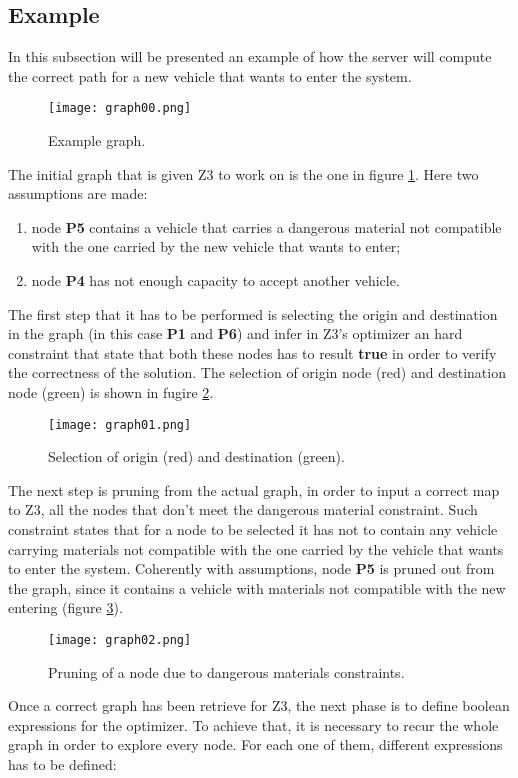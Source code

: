 \subsection{Example}
In this subsection will be presented an example of how the server will compute the correct path for a new vehicle that wants to enter the system.
\begin{figure}[!htb]
   \centering
   \texttt{[image: graph00.png]}
   \caption{Example graph.}\label{Fig:Graph00}
\end{figure}
The initial graph that is given Z3 to work on is the one in figure \ref{Fig:Graph00}. Here two assumptions are made:
\begin{enumerate}
  \item node \textbf{P5} contains a vehicle that carries a dangerous material not compatible with the one carried by the new vehicle that wants to enter;
  \item node \textbf{P4} has not enough capacity to accept another vehicle.
\end{enumerate}
The first step that it has to be performed is selecting the origin and destination in the graph (in this case \textbf{P1} and \textbf{P6}) and infer in Z3's optimizer an hard constraint that state that both these nodes has to result \textbf{true} in order to verify the correctness of the solution. The selection of origin node (red) and destination node (green) is shown in fugire \ref{Fig:Graph01}.
\begin{figure}[!htb]
   \centering
   \texttt{[image: graph01.png]}
   \caption{Selection of origin (red) and destination (green).}\label{Fig:Graph01}
\end{figure}
The next step is pruning from the actual graph, in order to input a correct map to Z3, all the nodes that don't meet the dangerous material constraint. Such constraint states that for a node to be selected it has not to contain any vehicle carrying materials not compatible with the one carried by the vehicle that wants to enter the system. Coherently with assumptions, node \textbf{P5} is pruned out from the graph, since it contains a vehicle with materials not compatible with the new entering (figure \ref{Fig:Graph02}).
\begin{figure}[!htb]
   \centering
   \texttt{[image: graph02.png]}
   \caption{Pruning of a node due to dangerous materials constraints.}\label{Fig:Graph02}
\end{figure}
Once a correct graph has been retrieve for Z3, the next phase is to define boolean expressions for the optimizer. To achieve that, it is necessary to recur the whole graph in order to explore every node. For each one of them, different expressions has to be defined:
